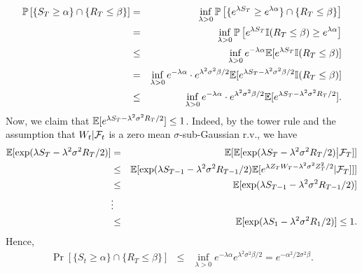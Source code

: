 		\begin{eqnarray*}
		\mathbb{P}\left[ \left\{S_T \ge \alpha\right\} \cap \left\{ R_T \le \beta\right\}\right] &=& \inf_{\lambda > 0}\mathbb{P}\left[ \{e^{\lambda S_T} \ge e^{\lambda \alpha}\} \cap \{R_T \le \beta\}\right]\\
	&=& \inf_{\lambda > 0}\mathbb{P}\left[e^{\lambda S_T}\mathbb{I}(R_T \le \beta) \geq e^{\lambda \alpha} \right] \\
		&\le& \inf_{\lambda > 0}e^{-\lambda \alpha} \mathbb{E}[e^{\lambda S_T} \mathbb{I}(R_T \le \beta)]\\
		&=& \inf_{\lambda > 0}e^{-\lambda \alpha }\cdot e^{\lambda^2 \sigma^2\beta/2}\mathbb{E}[e^{\lambda S_T -\lambda^2 \sigma^2 \beta / 2} \mathbb{I}(R_T \le \beta)]\\
		&\le& \inf_{\lambda > 0} e^{-\lambda \alpha }\cdot e^{\lambda^2 \sigma^2\beta/2}\mathbb{E}[e^{\lambda S_T -\lambda^2 \sigma^2R_T / 2}].
		\end{eqnarray*}
		Now, we claim that $\mathbb{E}[e^{\lambda S_T -\lambda^2 \sigma^2 R_T/2}] \le 1$. Indeed, by the tower rule
	  and the assumption that $W_t | \mathcal{F}_t$ is a zero mean $\sigma$-sub-Gaussian r.v.,
	  we have
		\begin{eqnarray}
		\mathbb{E}[\exp(\lambda S_T - \lambda^2 \sigma^2 R_T/2) ] &=& \mathbb{E}[\mathbb{E}[\exp(\lambda S_T - \lambda^2 \sigma^2 R_T/2)  \big{|} \mathcal{F}_{T}]]\nonumber\\
		&\le& \mathbb{E}[\exp(\lambda S_{T-1} - \lambda^2 \sigma^2 R_{T-1}/2)\mathbb{E}[e^{\lambda Z_T W_T - \lambda^2 \sigma^2 Z_T^2 / 2} | \mathcal{F}_{T}]  ] ]\nonumber\\
	  &\le& \mathbb{E}[\exp(\lambda S_{T-1} - \lambda^2 \sigma^2 R_{T-1}/2)]\nonumber\\
	  &\vdots& \nonumber\\
		&\le&\mathbb{E}[\exp(\lambda S_{1} - \lambda^2 \sigma^2 R_{1}/2)] \le 1.\label{eq:last_line_exp}
	 	\end{eqnarray}
		Hence,
		\begin{eqnarray*}
		\Pr[ \{S_t \ge \alpha\} \cap \{R_T \le \beta\}] &\leq& \inf_{\lambda > 0}  e^{-\lambda \alpha }e^{\lambda^2\sigma^2 \beta/2} = e^{-\alpha^2/2\sigma^2\beta}.
	\end{eqnarray*}

